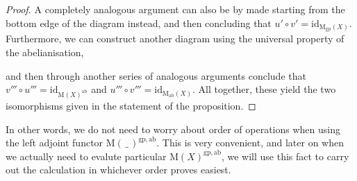 \begin{proof}
A completely analogous argument can also be by made starting from the bottom edge of the diagram instead, and then concluding that $u' \circ v' = \mathrm{id}_{\mathrm{M}_{\mathrm{gp}}(X)}$. Furthermore, we can construct another diagram using the universal property of the abelianisation,
\begin{eq*}  \end{eq*}
and then through another series of analogous arguments conclude that $v''' \circ u''' = \mathrm{id}_{\mathrm{M}(X)^{\mathrm{ab}}}$ and $u''' \circ v''' = \mathrm{id}_{\mathrm{M}_{\mathrm{ab}}(X)}$. All together, these yield the two isomorphisms given in the statement of the proposition.
\end{proof}

In other words, we do not need to worry about order of operations when using the left adjoint functor $\mathrm{M}(\, \_ \,)^{\mathrm{gp},\mathrm{ab}}$. This is very convenient, and later on when we actually need to evalute particular $\mathrm{M}(X)^{\mathrm{gp},\mathrm{ab}}$, we will use this fact to carry out the calculation in whichever order proves easiest. 